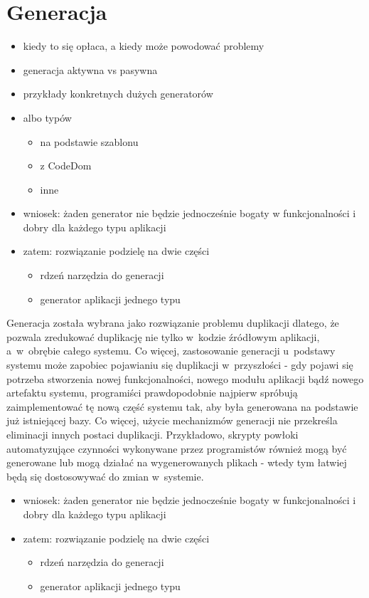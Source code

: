 \chapter{Generacja} \label{chap:generation}

\begin{itemize}
 \item kiedy to się opłaca, a kiedy może powodować problemy
 \item generacja aktywna vs pasywna
 \item przykłady konkretnych dużych generatorów
 \item albo typów
  \begin{itemize}
   \item na podstawie szablonu
   \item z CodeDom
   \item inne
  \end{itemize}
 \item wniosek: żaden generator nie będzie jednocześnie bogaty w funkcjonalności i dobry dla każdego typu aplikacji
 \item zatem: rozwiązanie podzielę na dwie części
  \begin{itemize}
   \item rdzeń narzędzia do generacji
   \item generator aplikacji jednego typu
  \end{itemize}
\end{itemize}

Generacja została wybrana jako rozwiązanie problemu duplikacji dlatego, że pozwala zredukować duplikację nie tylko w~kodzie źródłowym aplikacji, a~w~obrębie całego systemu.
Co więcej, zastosowanie generacji u~podstawy systemu może zapobiec pojawianiu się duplikacji w~przyszłości - gdy pojawi się potrzeba stworzenia nowej funkcjonalności, nowego modułu aplikacji bądź nowego artefaktu systemu, programiści prawdopodobnie najpierw spróbują zaimplementować tę nową część systemu tak, aby była generowana na podstawie już istniejącej bazy.
Co więcej, użycie mechanizmów generacji nie przekreśla eliminacji innych postaci duplikacji.
Przykładowo, skrypty powłoki automatyzujące czynności wykonywane przez programistów również mogą być generowane lub mogą działać na wygenerowanych plikach - wtedy tym łatwiej będą się dostosowywać do zmian w~systemie.

\begin{itemize}
\item wniosek: żaden generator nie będzie jednocześnie bogaty w funkcjonalności i dobry dla każdego typu aplikacji
 \item zatem: rozwiązanie podzielę na dwie części
  \begin{itemize}
   \item rdzeń narzędzia do generacji
   \item generator aplikacji jednego typu
  \end{itemize}
\end{itemize}